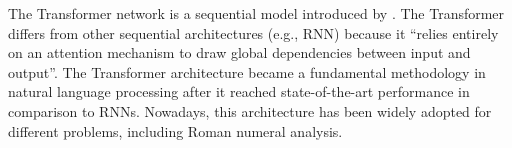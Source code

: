 

The Transformer network is a sequential model introduced by
\textcite{vaswani2017attention}. The Transformer differs
from other sequential architectures (e.g., RNN) because it
``relies entirely on an attention mechanism to draw global
dependencies between input and output''. The Transformer architecture became a fundamental methodology in natural language processing after it reached state-of-the-art performance in comparison to RNNs. Nowadays, this architecture has been widely adopted for different problems, including Roman numeral analysis.
